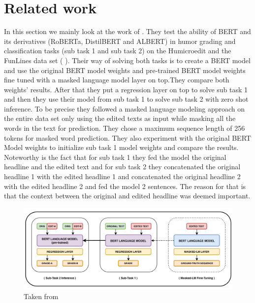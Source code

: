 \documentclass[11pt,a4paper,onecolumn,oneside,notitlepage]{article}
\begin{document}
	\section{Related work}
		In this section we mainly look at the work of \textcite{Bert1} .
		They test the ability of BERT and its derivatives (RoBERTa, DistilBERT and ALBERT) in humor grading and classification tasks (sub task 1 and sub task 2) on the Humicroedit and the FunLines data set ( \textcite{Bert2} ).
		Their way of solving both tasks is to create a  BERT model and use the original BERT model weights and  pre-trained BERT model weights fine tuned  with a masked language model layer on top.They compare both weights' results. After that they put a regression layer on top to solve sub task 1 and then they use their model from sub task 1 to solve sub task 2 with zero shot inference. 
		To be precise they followed a masked language modeling approach on the entire data set only using the edited texts as input while masking all the words in the text for prediction. They chose a maximum sequence length of 256 tokens for masked word prediction. They also experiment with the original BERT Model weights to initialize sub task 1 model weights and compare the results.
		Noteworthy is the fact that for sub  task 1 they fed the model the original headline and the edited text and for sub task 2 they concatenated the original headline 1 with the edited headline 1 and concatenated the original headline 2 with the edited headline 2 and fed the model 2 sentences.
		The reason for that is that the context between the original and edited headline was deemed important.

		\begin{figure}[htb!]
			\begin{center}
				\includegraphics[width=1.0\linewidth]{system_architecture.png}

			\end{center}
			
			\caption{ Taken from \cite{Bert1} }\label{fig1}
		\end{figure}
		
\end{document}
